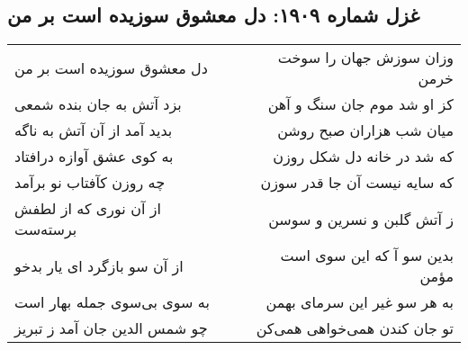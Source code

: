 \begin{center}
\section*{غزل شماره ۱۹۰۹: دل معشوق سوزیده است بر من}
\label{sec:1909}
\begin{longtable}{l p{0.5cm} r}
دل معشوق سوزیده است بر من
&&
وزان سوزش جهان را سوخت خرمن
\\
بزد آتش به جان بنده شمعی
&&
کز او شد موم جان سنگ و آهن
\\
بدید آمد از آن آتش به ناگه
&&
میان شب هزاران صبح روشن
\\
به کوی عشق آوازه درافتاد
&&
که شد در خانه دل شکل روزن
\\
چه روزن کآفتاب نو برآمد
&&
که سایه نیست آن جا قدر سوزن
\\
از آن نوری که از لطفش برسته‌ست
&&
ز آتش گلبن و نسرین و سوسن
\\
از آن سو بازگرد ای یار بدخو
&&
بدین سو آ که این سوی است مؤمن
\\
به سوی بی‌سوی جمله بهار است
&&
به هر سو غیر این سرمای بهمن
\\
چو شمس الدین جان آمد ز تبریز
&&
تو جان کندن همی‌خواهی همی‌کن
\\
\end{longtable}
\end{center}
